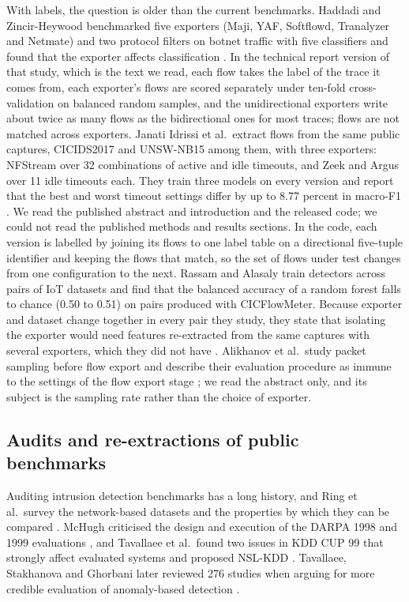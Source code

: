 \documentclass[pdflatex,sn-mathphys-num]{sn-jnl}
\newcommand{\litnum}[1]{#1}
\newcommand{\cicids}{CICIDS2017}
\theoremstyle{thmstyleone}%
\theoremstyle{thmstylethree}%
\begin{document}
With labels, the question is older than the current benchmarks. Haddadi and Zincir-Heywood benchmarked five exporters (Maji, YAF, Softflowd, Tranalyzer and Netmate) and two protocol filters on botnet traffic with five classifiers and found that the exporter affects classification \cite{haddadi2016}. In the technical report version of that study, which is the text we read, each flow takes the label of the trace it comes from, each exporter's flows are scored separately under ten-fold cross-validation on balanced random samples, and the unidirectional exporters write about twice as many flows as the bidirectional ones for most traces; flows are not matched across exporters. Janati Idrissi et al.\ extract flows from the same public captures, \cicids{} and UNSW-NB15 among them, with three exporters: NFStream over \litnum{32} combinations of active and idle timeouts, and Zeek and Argus over \litnum{11} idle timeouts each. They train three models on every version and report that the best and worst timeout settings differ by up to \litnum{8.77} percent in macro-F1 \cite{janatiidrissi2025}. We read the published abstract and introduction and the released code; we could not read the published methods and results sections. In the code, each version is labelled by joining its flows to one label table on a directional five-tuple identifier and keeping the flows that match, so the set of flows under test changes from one configuration to the next. Rassam and Alasaly train detectors across pairs of IoT datasets and find that the balanced accuracy of a random forest falls to chance (\litnum{0.50} to \litnum{0.51}) on pairs produced with CICFlowMeter. Because exporter and dataset change together in every pair they study, they state that isolating the exporter would need features re-extracted from the same captures with several exporters, which they did not have \cite{rassam2026}. Alikhanov et al.\ study packet sampling before flow export and describe their evaluation procedure as immune to the settings of the flow export stage \cite{alikhanov2022}; we read the abstract only, and its subject is the sampling rate rather than the choice of exporter.

\subsection{Audits and re-extractions of public benchmarks}

Auditing intrusion detection benchmarks has a long history, and Ring et al.\ survey the network-based datasets and the properties by which they can be compared \cite{ring2019}. McHugh criticised the design and execution of the DARPA 1998 and 1999 evaluations \cite{mchugh2000}, and Tavallaee et al.\ found two issues in KDD CUP 99 that strongly affect evaluated systems and proposed NSL-KDD \cite{tavallaee2009}. Tavallaee, Stakhanova and Ghorbani later reviewed \litnum{276} studies when arguing for more credible evaluation of anomaly-based detection \cite{tavallaee2010}.
\end{document}
